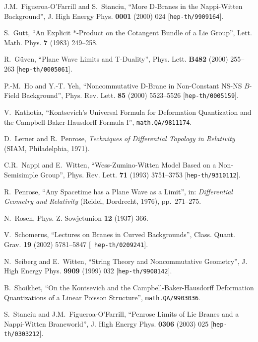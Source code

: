 \documentclass[11pt,a4paper]{article}
\begin{document}
\begin{thebibliography}{99}
 J.M.~Figueroa-O'Farrill and S.~Stanciu, ``More D-Branes
  in the Nappi-Witten Background'', J. High Energy Phys. {\bf 0001}
  (2000) 024 [{\tt hep-th/9909164}].

 S.~Gutt, ``An Explicit $*$-Product on the Cotangent
  Bundle of a Lie Group'', Lett. Math. Phys. {\bf 7} (1983) 249--258.

 R.~G\"uven, ``Plane Wave Limits and T-Duality'',
  Phys. Lett. {\bf B482} (2000) 255--263 [{\tt hep-th/0005061}].

 P.-M.~Ho and Y.-T. Yeh, ``Noncommutative D-Brane in
  Non-Constant NS-NS $B$-Field Background'', Phys. Rev. Lett. {\bf 85}
  (2000) 5523--5526 [{\tt hep-th/0005159}].

 V.~Kathotia, ``Kontsevich's Universal Formula for
  Deformation Quantization and the Campbell-Baker-Hausdorff Formula
  I'', {\tt math.QA/9811174}.

 D.~Lerner and R.~Penrose, {\it Techniques of
    Differential Topology in Relativity} (SIAM, Philadelphia, 1971).

 C.R.~Nappi and E.~Witten, ``Wess-Zumino-Witten Model Based on a
  Non-Semisimple Group'', Phys. Rev. Lett. {\bf 71} (1993) 3751--3753
  [{\tt hep-th/9310112}].

 R.~Penrose, ``Any Spacetime has a Plane Wave as a
  Limit'', in: {\it Differential Geometry and Relativity} (Reidel,
  Dordrecht, 1976), pp.~271--275.

 N.~Rosen, Phys. Z. Sowjetunion {\bf 12} (1937) 366.

 V.~Schomerus, ``Lectures on Branes in Curved
  Backgrounds'', Class. Quant. Grav. {\bf 19} (2002) 5781--5847 [{\tt
  hep-th/0209241}].

 N.~Seiberg and E.~Witten, ``String Theory and
  Noncommutative Geometry'', J. High Energy Phys. {\bf 9909} (1999)
  032 [{\tt hep-th/9908142}].

 B.~Shoikhet, ``On the Kontsevich and the
  Campbell-Baker-Hausdorff Deformation Quantizations of a Linear
  Poisson Structure'', {\tt math.QA/9903036}.

 S.~Stanciu and J.M.~Figueroa-O'Farrill, ``Penrose Limits
  of Lie Branes and a Nappi-Witten Braneworld'', J. High Energy
  Phys. {\bf 0306} (2003) 025 [{\tt hep-th/0303212}].

\end{thebibliography}
\end{document}
